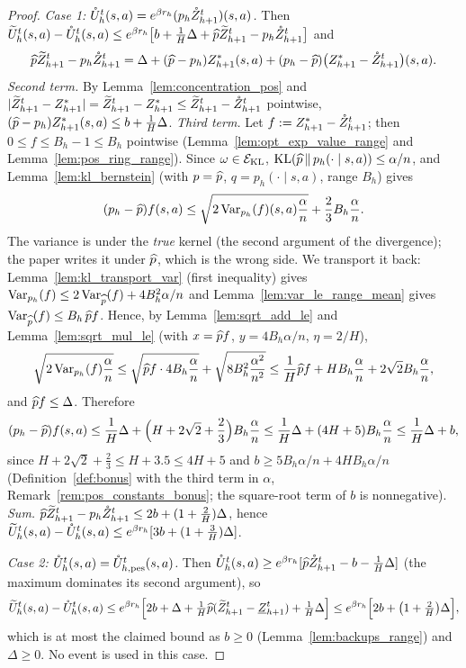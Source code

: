 \begin{proof}
\emph{Case 1: $\mathring{U}_h^t(s,a) = e^{\beta r_h}(p_h\mathring{Z}^t_{h+1})(s,a)$.} Then
$\widetilde{U}_h^t(s,a) - \mathring{U}_h^t(s,a) \le e^{\beta r_h}\big[b + \frac1H\Delta + \widehat{p}\widetilde{Z}^t_{h+1} - p_h\mathring{Z}^t_{h+1}\big]$ and
\[
  \widehat{p}\widetilde{Z}^t_{h+1} - p_h\mathring{Z}^t_{h+1}
  = \Delta + (\widehat{p} - p_h)Z^*_{h+1}(s,a) + (p_h - \widehat{p})\big(Z^*_{h+1} - \mathring{Z}^t_{h+1}\big)(s,a) .
\]
\emph{Second term.} By Lemma~\ref{lem:concentration_pos} and $\lvert \widetilde{Z}^t_{h+1} - Z^*_{h+1} \rvert = \widetilde{Z}^t_{h+1} - Z^*_{h+1} \le \widetilde{Z}^t_{h+1} - \mathring{Z}^t_{h+1}$
pointwise, $(\widehat{p} - p_h)Z^*_{h+1}(s,a) \le b + \frac1H\Delta$.
\emph{Third term.} Let $f := Z^*_{h+1} - \mathring{Z}^t_{h+1}$; then $0 \le f \le B_h - 1 \le B_h$ pointwise
(Lemma~\ref{lem:opt_exp_value_range} and Lemma~\ref{lem:pos_ring_range}). Since $\omega \in \mathcal{E}_{\mathrm{KL}}$,
$\mathrm{KL}(\widehat{p}\,\|\,p_h(\cdot\mid s,a)) \le \alpha/n$, and Lemma~\ref{lem:kl_bernstein} (with $p = \widehat{p}$,
$q = p_h(\cdot \mid s,a)$, range $B_h$) gives
\[
  (p_h - \widehat{p}) f(s,a) \le \sqrt{2\operatorname{Var}_{p_h}(f)(s,a)\frac{\alpha}{n}} + \frac23 B_h\frac{\alpha}{n} .
\]
The variance is under the \emph{true} kernel (the second argument of the divergence); the
paper writes it under $\widehat{p}$, which is the wrong side. We transport it back:
Lemma~\ref{lem:kl_transport_var} (first inequality) gives $\operatorname{Var}_{p_h}(f) \le 2\operatorname{Var}_{\widehat{p}}(f) + 4B_h^2\alpha/n$
and Lemma~\ref{lem:var_le_range_mean} gives $\operatorname{Var}_{\widehat{p}}(f) \le B_h\,\widehat{p} f$. Hence, by
Lemma~\ref{lem:sqrt_add_le} and Lemma~\ref{lem:sqrt_mul_le} (with $x = \widehat{p} f$, $y = 4B_h\alpha/n$,
$\eta = 2/H$),
\[
  \sqrt{2\operatorname{Var}_{p_h}(f)\frac{\alpha}{n}}
  \le \sqrt{\widehat{p} f \cdot 4 B_h \frac{\alpha}{n}} + \sqrt{8 B_h^2\frac{\alpha^2}{n^2}}
  \le \frac1H \widehat{p} f + H B_h\frac{\alpha}{n} + 2\sqrt2 B_h \frac{\alpha}{n} ,
\]
and $\widehat{p} f \le \Delta$. Therefore
\[
  (p_h - \widehat{p})f(s,a) \le \frac1H\Delta + \Big(H + 2\sqrt2 + \frac23\Big) B_h\frac{\alpha}{n}
  \le \frac1H\Delta + (4H + 5) B_h \frac{\alpha}{n} \le \frac1H \Delta + b ,
\]
since $H + 2\sqrt2 + \frac23 \le H + 3.5 \le 4H + 5$ and $b \ge 5B_h\alpha/n + 4HB_h\alpha/n$
(Definition~\ref{def:bonus} with the third term in $\alpha$, Remark~\ref{rem:pos_constants_bonus};
the square-root term of $b$ is nonnegative).
\emph{Sum.} $\widehat{p}\widetilde{Z}^t_{h+1} - p_h\mathring{Z}^t_{h+1} \le 2b + (1 + \frac2H)\Delta$, hence
$\widetilde{U}_h^t(s,a) - \mathring{U}_h^t(s,a) \le e^{\beta r_h}[3b + (1 + \frac3H)\Delta]$.

\emph{Case 2: $\mathring{U}_h^t(s,a) = \mathring{U}^t_{h,\mathrm{pes}}(s,a)$.} Then
$\mathring{U}_h^t(s,a) \ge e^{\beta r_h}[\widehat{p}\mathring{Z}^t_{h+1} - b - \frac1H\Delta]$ (the maximum dominates its
second argument), so
\[
  \widetilde{U}_h^t(s,a) - \mathring{U}_h^t(s,a) \le e^{\beta r_h}\Big[2b + \Delta + \tfrac1H\widehat{p}(\widetilde{Z}^t_{h+1} - \underline{Z}^t_{h+1}) + \tfrac1H\Delta\Big]
  \le e^{\beta r_h}\Big[2b + \big(1 + \tfrac2H\big)\Delta\Big] ,
\]
which is at most the claimed bound as $b \ge 0$ (Lemma~\ref{lem:backups_range}) and $\Delta \ge 0$.
No event is used in this case.
\end{proof}

